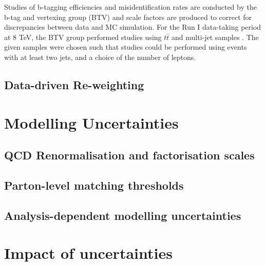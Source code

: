 
Studies of b-tagging efficiencies and misidentification rates are conducted by the b-tag and vertexing group (BTV) and scale factors are produced to correct for discrepancies between data and MC simulation. For the Run I data-taking period at 8 TeV, the BTV group performed studies using $t\bar{t}$ and multi-jet samples \cite{BTAGPAS}. The given samples were chosen such that studies could be performed using events with at least two jets, and a choice of the number of leptons. %

\subsection{Data-driven Re-weighting} \label{subsec-DataDriverReweightingUncertainties}




\section{Modelling Uncertainties} \label{sec-ModellingUncertainties}

\subsection{QCD Renormalisation and factorisation scales}

\subsection{Parton-level matching thresholds}

\subsection{Analysis-dependent modelling uncertainties}

\section{Impact of uncertainties}

